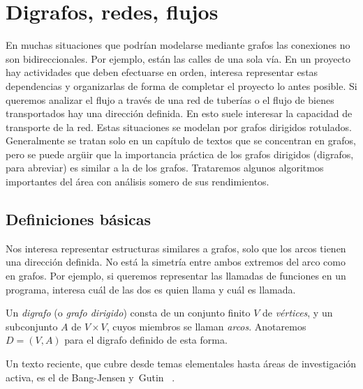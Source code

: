 %

\chapter{Digrafos, redes, flujos}
\label{cha:digrafos}

  En muchas situaciones que podrían modelarse mediante grafos
  las conexiones no son bidireccionales.
  Por ejemplo,
  están las calles de una sola vía.
  En un proyecto hay actividades que deben efectuarse en orden,
  interesa representar estas dependencias
  y organizarlas de forma de completar el proyecto lo antes posible.
  Si queremos analizar el flujo a través de una red de tuberías
  o el flujo de bienes transportados
  hay una dirección definida.
  En esto suele interesar la capacidad de transporte de la red.
  Estas situaciones se modelan por grafos dirigidos rotulados.
  Generalmente se tratan solo en un capítulo de textos
  que se concentran en grafos,
  pero se puede argüir
  que la importancia práctica de los grafos dirigidos
  (digrafos, para abreviar)
  es similar a la de los grafos.
  Trataremos algunos algoritmos importantes del área
  con análisis somero de sus rendimientos.

\section{Definiciones básicas}
\label{sec:definiciones-basicas}

  Nos interesa representar estructuras similares a grafos,
  solo que los arcos tienen una dirección definida.
  No está la simetría entre ambos extremos del arco como en grafos.
  Por ejemplo,
  si queremos representar las llamadas de funciones en un programa,
  interesa cuál de las dos es quien llama y cuál es llamada.
  \begin{definition}
    Un \emph{digrafo}
    (o \emph{grafo dirigido})
    consta de un conjunto finito \(V\) de \emph{vértices},%
    y un subconjunto \(A\) de \(V \times V\),
    cuyos miembros se llaman \emph{arcos}.%
    Anotaremos \(D = (V, A)\)
    para el digrafo definido de esta forma.
  \end{definition}
  Un texto reciente,
  que cubre desde temas elementales
  hasta áreas de investigación activa,
  es el de Bang-Jensen y~Gutin~%
    \cite{bang-jensen09:_digraphs}.

